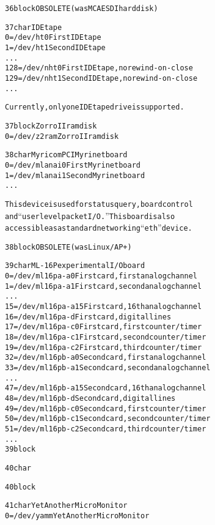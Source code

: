 \documentclass[a4paper,8pt,english]{sphinxmanual}
\begin{document}
\begin{alltt}
  36 block      OBSOLETE (was MCA ESDI hard disk)

  37 char       IDE tape
                  0 = /dev/ht0          First IDE tape
                  1 = /dev/ht1          Second IDE tape
                    ...
                128 = /dev/nht0         First IDE tape, no rewind-on-close
                129 = /dev/nht1         Second IDE tape, no rewind-on-close
                    ...

                Currently, only one IDE tape drive is supported.

  37 block      Zorro II ramdisk
                  0 = /dev/z2ram        Zorro II ramdisk

  38 char       Myricom PCI Myrinet board
                  0 = /dev/mlanai0      First Myrinet board
                  1 = /dev/mlanai1      Second Myrinet board
                    ...

                This device is used for status query, board control
                and ``user level packet I/O.''  This board is also
                accessible as a standard networking ``eth'' device.

  38 block      OBSOLETE (was Linux/AP+)

  39 char       ML-16P experimental I/O board
                  0 = /dev/ml16pa-a0    First card, first analog channel
                  1 = /dev/ml16pa-a1    First card, second analog channel
                    ...
                 15 = /dev/ml16pa-a15   First card, 16th analog channel
                 16 = /dev/ml16pa-d     First card, digital lines
                 17 = /dev/ml16pa-c0    First card, first counter/timer
                 18 = /dev/ml16pa-c1    First card, second counter/timer
                 19 = /dev/ml16pa-c2    First card, third counter/timer
                 32 = /dev/ml16pb-a0    Second card, first analog channel
                 33 = /dev/ml16pb-a1    Second card, second analog channel
                    ...
                 47 = /dev/ml16pb-a15   Second card, 16th analog channel
                 48 = /dev/ml16pb-d     Second card, digital lines
                 49 = /dev/ml16pb-c0    Second card, first counter/timer
                 50 = /dev/ml16pb-c1    Second card, second counter/timer
                 51 = /dev/ml16pb-c2    Second card, third counter/timer
                      ...
  39 block

  40 char

  40 block

  41 char       Yet Another Micro Monitor
                  0 = /dev/yamm         Yet Another Micro Monitor


\end{alltt}
\end{document}
